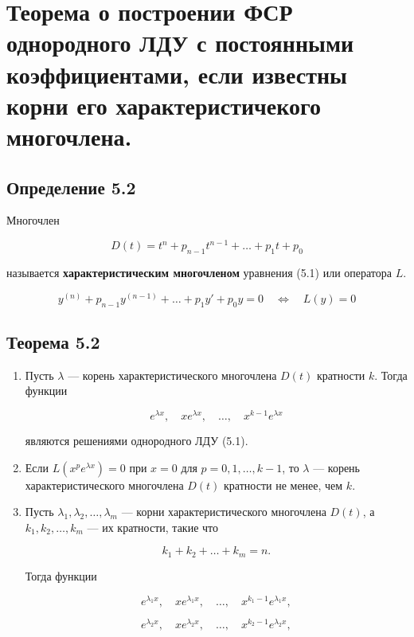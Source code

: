 {
	\section{Теорема о построении ФСР однородного ЛДУ с постоянными коэффициентами, если известны корни его
	характеристичекого многочлена.}

	\subsection*{Определение 5.2}

	Многочлен


	\[
	D(t) = t^n + p_{n-1} t^{n-1} + \ldots + p_1 t + p_0
	\]


	называется \textbf{характеристическим многочленом} уравнения (5.1) или оператора \( L \).

	\[
		y^{(n)} + p_{n-1} y^{(n-1)} + \ldots + p_1 y' + p_0 y = 0 \quad \iff \quad L(y) = 0 \tag{5.1}
	\]

	\subsection*{Теорема 5.2}

	\begin{enumerate}
	\item Пусть \( \lambda \) — корень характеристического многочлена \( D(t) \) кратности \( k \). Тогда функции
	

	\[
	e^{\lambda x},\quad x e^{\lambda x},\quad \ldots,\quad x^{k-1} e^{\lambda x}
	\]


	являются решениями однородного ЛДУ (5.1).

	\item Если \( L(x^p e^{\lambda x}) = 0 \) при \( x = 0 \) для \( p = 0, 1, \ldots, k-1 \), то \( \lambda \) — корень характеристического многочлена \( D(t) \) кратности не менее, чем \( k \).

	\item Пусть \( \lambda_1, \lambda_2, \ldots, \lambda_m \) — корни характеристического многочлена \( D(t) \), а \( k_1, k_2, \ldots, k_m \) — их кратности, такие что
	

	\[
	k_1 + k_2 + \ldots + k_m = n.
	\]


	Тогда функции
	

	\[
	e^{\lambda_1 x},\quad x e^{\lambda_1 x},\quad \ldots,\quad x^{k_1 - 1} e^{\lambda_1 x},
	\]


	

	\[
	e^{\lambda_2 x},\quad x e^{\lambda_2 x},\quad \ldots,\quad x^{k_2 - 1} e^{\lambda_2 x},
	\]



\end{enumerate}}
